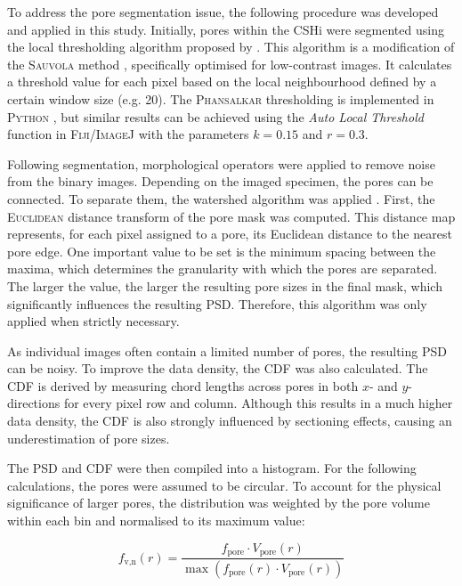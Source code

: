 To address the pore segmentation issue, the following procedure was developed and applied in this study.
Initially, pores within the \ac{CSHi} were segmented using the local thresholding algorithm proposed by \textcite{phansalkar.2011}.
This algorithm is a modification of the \textsc{Sauvola} method \cite{sauvola.2000}, specifically optimised for low-contrast images.
It calculates a threshold value for each pixel based on the local neighbourhood defined by a certain window size (e.g. \qty{20}{\px}).
The \textsc{Phansalkar} thresholding is implemented in \textsc{Python} \cite{kleiner.2021}, but similar results can be achieved using the \textit{Auto Local Threshold} function in \textsc{Fiji}/\textsc{ImageJ} \cite{schindelin.2012} with the parameters $k = \num{0.15}$ and $r = \num{0.3}$.

Following segmentation, morphological operators were applied to remove noise from the binary images.
Depending on the imaged specimen, the pores can be connected.
To separate them, the watershed algorithm was applied \cite{beucher.1992}.
First, the \textsc{Euclidean} distance transform of the pore mask was computed.
This distance map represents, for each pixel assigned to a pore, its Euclidean distance to the nearest pore edge.
One important value to be set is the minimum spacing between the maxima, which determines the granularity with which the pores are separated.
The larger the value, the larger the resulting pore sizes in the final mask, which significantly influences the resulting \ac{PSD}.
Therefore, this algorithm was only applied when strictly necessary.

As individual images often contain a limited number of pores, the resulting \ac{PSD} can be noisy.
To improve the data density, the \ac{CDF} \cite{torquato.2002} was also calculated.
The \ac{CDF} is derived by measuring chord lengths across pores in both $x$- and $y$-directions for every pixel row and column.
Although this results in a much higher data density, the \ac{CDF} is also strongly influenced by sectioning effects, causing an underestimation of pore sizes.

The \ac{PSD} and \ac{CDF} were then compiled into a histogram.
For the following calculations, the pores were assumed to be circular.
To account for the physical significance of larger pores, the distribution was weighted by the pore volume within each bin and normalised to its maximum value:

\begin{equation}
    f_\text{v,n}(r) = \frac{f_\text{pore} \cdot V_\text{pore}(r)}{\max(f_\text{pore}(r) \cdot V_\text{pore}(r))}
	\label{eq:weig_norm_pore_frequency}
\end{equation}

